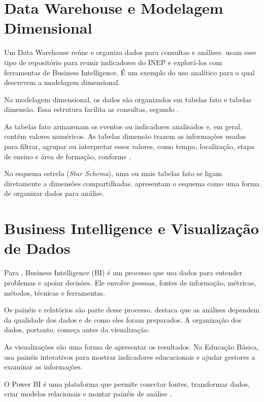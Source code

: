 \section{Data Warehouse e Modelagem Dimensional}

Um Data Warehouse reúne e organiza dados para consultas e análises.  usam esse tipo de repositório para reunir indicadores do INEP e explorá-los com ferramentas de Business Intelligence. É um exemplo do uso analítico para o qual  descrevem a modelagem dimensional.

Na modelagem dimensional, os dados são organizados em tabelas fato e tabelas dimensão. Essa estrutura facilita as consultas, segundo .

As tabelas fato armazenam os eventos ou indicadores analisados e, em geral, contêm valores numéricos. As tabelas dimensão trazem as informações usadas para filtrar, agrupar ou interpretar esses valores, como tempo, localização, etapa de ensino e área de formação, conforme .

No esquema estrela (\textit{Star Schema}), uma ou mais tabelas fato se ligam diretamente a dimensões compartilhadas.  apresentam o esquema como uma forma de organizar dados para análise.

\section{Business Intelligence e Visualização de Dados}

Para , Business Intelligence (BI) é um processo que usa dados para entender problemas e apoiar decisões. Ele envolve pessoas, fontes de informação, métricas, métodos, técnicas e ferramentas.

Os painéis e relatórios são parte desse processo.  destaca que as análises dependem da qualidade dos dados e de como eles foram preparados. A organização dos dados, portanto, começa antes da visualização.

As visualizações são uma forma de apresentar os resultados. Na Educação Básica,  usa painéis interativos para mostrar indicadores educacionais e ajudar gestores a examinar as informações.

O Power BI é uma plataforma que permite conectar fontes, transformar dados, criar modelos relacionais e montar painéis de análise \cite{microsoft2025powerbi}.

